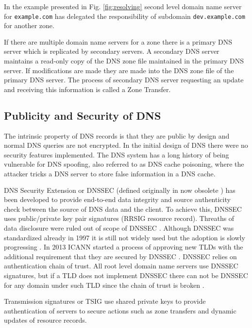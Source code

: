 In the example presented in Fig. \ref{fig:resolving} second level domain name server for \texttt{example.com} has delegated the responsibility of subdomain \texttt{dev.example.com} for another zone.

If there are multiple domain name servers for a zone there is a primary DNS server which is replicated by secondary servers. A secondary DNS server maintains a read-only copy of the DNS zone file maintained in the primary DNS server. If modifications are made they are made into the DNS zone file of the primary DNS server. The process of secondary DNS server requesting an update and receiving this information is called a Zone Transfer. \citep{tanenbaum}

\subsection{Publicity and Security of DNS}
\label{sec:dns_security}


The intrinsic property of DNS records is that they are public by design and normal DNS queries are not encrypted. In the initial design of DNS there were no security features implemented. The DNS system has a long history of being vulnerable for DNS spoofing, also referred to as DNS cache poisoning, where the attacker tricks a DNS server to store false information in a DNS cache. \cite{tanenbaum}\cite{RFC_threat_analysis} 

DNS Security Extension or DNSSEC (defined originally in now obsolete \cite{RFC_2065}) has been developed to provide end-to-end data integrity and source authenticity check between the source of DNS data and the client. To achieve this, DNSSEC uses public/private key pair signatures (RRSIG resource record). Threaths of data disclosure were ruled out of scope of DNSSEC \cite{RFC_threat_analysis}. Although DNSSEC was standardized already in 1997 it is still not widely used but the adoption is slowly progressing \cite{lotr}. In 2013 ICANN started a process of approving new TLDs with the additional requirement that they are secured by DNSSEC \cite{sweden}. DNSSEC relies on authentication chain of trust. All root level domain name servers use DNSSEC signatures, but if a TLD does not implement DNSSEC there can not be DNSSEC for any domain under such TLD since the chain of trust is broken \cite{lotr}.

Transmission signatures or TSIG \cite{RFC_2845_trans_sec} use shared private keys to provide authentication of servers to secure actions such as zone transfers and dynamic updates of resource records.


